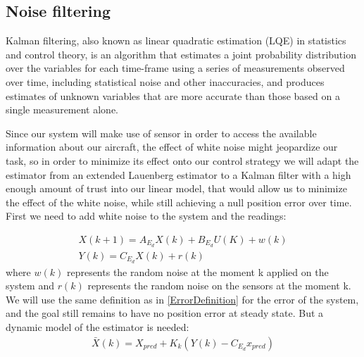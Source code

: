 \documentclass[conference]{IEEEtran}
\begin{document}
\subsection{Noise filtering}
Kalman filtering, also known as linear quadratic estimation (LQE) in statistics
and control theory, is an algorithm that estimates a joint probability
distribution over the variables for each time-frame using a series of
measurements observed over time, including statistical noise and other
inaccuracies, and produces estimates of unknown variables that are more
accurate than those based on a single measurement alone.
\par
Since our system will make use of sensor in order to access the available
information about our aircraft, the effect of white noise might jeopardize our
task, so in order to minimize its effect onto our control strategy we will
adapt the estimator from an extended Lauenberg estimator to a Kalman filter
with a high enough amount of trust into our linear model, that would allow us to
minimize the effect of the white noise, while still achieving a null position error over
time. First we need to add white noise to the system and the readings:
\par
\begin{align}
    X(k+1)=A_{E_d}X(k)+B_{E_d}U(K)+w(k) \\
    Y(k)=C_{E_d}X(k)+r(k)
    \label{LinearDiscreteExtendedSystemWithWhiteNoiseFormula}
\end{align}
where $w(k)$ represents the random noise at the moment k applied on the system and $r(k)$ represents the random noise on the sensors at the moment k.
We will use the same definition as in {\ref{ErrorDefinition}} for the error of the system, and the goal still remains to have no position error at steady state.
But a dynamic model of the estimator is needed:
\begin{align}
    \bar{X}(k)=X_{pred}+K_k(Y(k)-C_{E_d}x_{pred})
    \label{KalmanCorrection}
\end{align}
\end{document}
